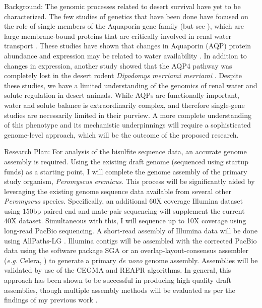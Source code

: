 \documentclass[11pt]{article}
\begin{document}
Background: The genomic processes related to desert survival have yet to be characterized. The few studies of genetics that have been done have focused on the role of single members of the Aquaporin gene family (but see \cite{Bartolo:2007hy}), which are large membrane-bound proteins that are critically involved in renal water transport \citep{Kwon:2009bv,Verkman:2002ww,Brown:1995vo,Nielsen:1995cb}. These studies have shown that changes in Aquaporin (AQP) protein abundance and expression may be related to water availability \citep{Boselt:2009fb, Gallardo:2005fm,Bozinovic:2003eg}. In addition to changes in expression, another study showed that the AQP4 pathway was completely lost in the desert rodent \textit{Dipodomys merriami merriami} \citep{Huang:2001ti}. Despite these studies, we have a limited understanding of the genomics of renal water and solute regulation in desert animals. While AQPs are functionally important, water and solute balance is extraordinarily complex, and therefore single-gene studies are necessarily limited in their purview. A more complete understanding of this phenotype and its mechanistic underpinnings will require a sophisticated genome-level approach, which will be the outcome of the proposed research.  

Research Plan: For analysis of the bisulfite sequence data, an accurate genome assembly is required. Using the existing draft genome (sequenced using startup funds) as a starting point, I will complete the genome assembly of the primary study organism, \textit{Peromyscus eremicus}. This process will be significantly aided by leveraging the existing genome sequence data available from several other \textit{Peromyscus} species. Specifically, an additional 60X coverage Illumina dataset using 150bp paired end and mate-pair sequencing will supplement the current 40X dataset. Simultaneous with this, I will sequence up to 10X coverage using long-read PacBio sequencing. A short-read assembly of Illumina data will be done using AllPaths-LG \citep{Maccallum:2009du}.  Illumina contigs will be assembled with the corrected PacBio data using the software package SGA \citep{Simpson:2012ef} or an overlap-layout-consensus assembler (\textit{e.g.} Celera, \cite{Miller:2008jx}) to generate a primary \textit{de novo} genome assembly. Assemblies will be validated by use of the CEGMA \citep{Parra:2007df} and REAPR \citep{Hunt:2013hj} algorithms. In general, this approach has been shown to be successful in producing high quality draft assemblies, though multiple assembly methods will be evaluated as per the findings of my previous work \citep{Bradnam:2013gx}.\\
\end{document}
